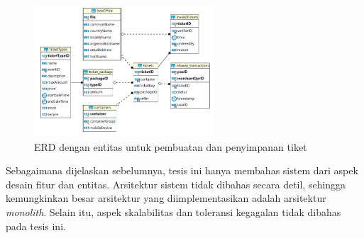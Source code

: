 \begin{figure}[ht]
    \centering
    \includegraphics[width=0.6\textwidth]{resources/chapter-2/er-ticket-storage.png}
    \caption{ERD dengan entitas untuk pembuatan dan penyimpanan tiket \parencite{backendForTicketing}}
    \label{fig:ticket-storage}
\end{figure}

Sebagaimana dijelaskan sebelumnya, tesis ini hanya membahas sistem dari aspek desain fitur dan entitas. Arsitektur sistem tidak dibahas secara detil, sehingga kemungkinkan besar arsitektur yang diimplementasikan adalah arsitektur \textit{monolith}. Selain itu, aspek skalabilitas dan toleransi kegagalan tidak dibahas pada tesis ini.